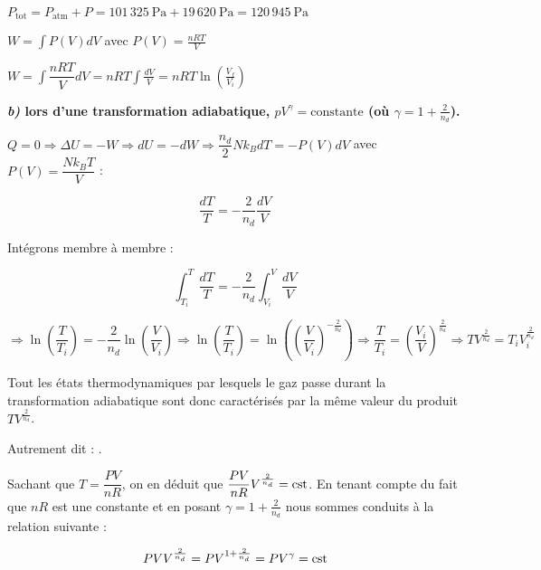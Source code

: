 \documentclass[british,french,11pt, a4paper, openany]{book}
\begin{document}
		$P_{\text{tot}} = P_{\text{atm}} + P = 101\,325\ \text{Pa} + 19\,620\ \text{Pa} = 120\,945\ \text{Pa}$
		
		\vspace{0,5cm}
		
			
		$W = \int P(V)dV$ avec $P(V) = \frac{nRT}{V}$
			
		$W = \int \dfrac{nRT}{V} dV = nRT \int \frac{dV}{V} = nRT \ln(\frac{V_f}{V_i})$
			
		\textbf{\textit{b)} lors d’une transformation adiabatique, $pV^{\gamma} = \text{constante}$ (où $\gamma = 1 + \frac{2}{n_d}$).}
			
		$Q = 0 \Rightarrow \Delta U = -W \Rightarrow dU = -dW \Rightarrow \dfrac{n_d}{2}Nk_BdT = -P(V)dV $ avec $P(V) = \dfrac{Nk_BT}{V}$ :
			
		$$\dfrac{dT}{T} = -\dfrac{2}{n_d}\dfrac{dV}{V}$$
			
		Intégrons membre à membre :
			
		$$\int_{T_i}^{T} \frac{dT}{T} = -\frac{2}{n_d} \int_{V_i}^{V} \frac{dV}{V}$$
			
		$\Rightarrow \ln \left(\dfrac{T}{T_i}\right) = -\dfrac{2}{n_d} \ln \left(\dfrac{V}{V_i}\right) \Rightarrow \ln \left(\dfrac{T}{T_i}\right) =  \ln \left(\left(\dfrac{V}{V_i}\right)^{-\frac{2}{n_d}}\right) \Rightarrow \dfrac{T}{T_i} = \left(\dfrac{V_i}{V}\right)^{\frac{2}{n_d}} \Rightarrow TV^{\frac{2}{n_d}} = T_i V_i^{\frac{2}{n_d}}$
			
		Tout les états thermodynamiques par lesquels le gaz passe durant la transformation adiabatique sont donc caractérisés par la même valeur du produit $TV^{\frac{2}{n_d}}$.
			
		Autrement dit : .
			
		Sachant que $T = \dfrac{PV}{nR}$, on en déduit que $\dfrac{PV}{nR}V^{\frac{2}{n_d}} = \text{cst}$. En tenant compte du fait que $nR$ est une constante et en posant $\gamma=1+\frac{2}{n_d}$ nous sommes conduits à la relation suivante :
			
		$$PV V^{\frac{2}{n_d}} = PV^{1+\frac{2}{n_d}}= PV^\gamma=\text{cst} $$
		
		\vspace{0,5cm}
		
			
\end{document}
